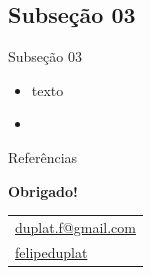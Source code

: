 \documentclass[aspectratio=169, 9pt]{beamer}
\begin{document}
\subsection[]{Subseção 03}

\begin{frame}{Subseção 03}
	\begin{itemize}[<+->]
		\item texto
		\item 
	\end{itemize}
\end{frame}



\begin{frame}{Referências}
\printbibliography
\end{frame}


\begin{frame}
	\begin{center}
			\textbf{Obrigado!} \\
			\vspace{0.5cm}
			
			\begin{tabular}{l}
				\faAt \hspace{0.001mm} \href{mailto:duplat.f@gmail.com}{duplat.f@gmail.com} \\
				\faLinkedin \hspace{0.001mm} \href{https://www.linkedin.com/in/felipeduplat/}{felipeduplat}
			\end{tabular}
		\end{center}
\end{frame}
\end{document}
